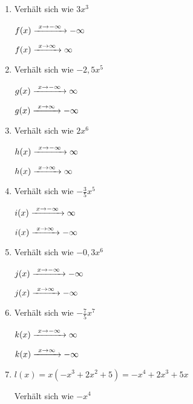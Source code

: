 \begin{Answer}[ref=ganzVerA1]

	\begin{minipage}{\textwidth}
		\begin{minipage}[t]{0.5\textwidth}
			\begin{enumerate}[label=\alph*)]
				\item Verhält sich wie \(3x^3\)

				\(f(x)\xrightarrow{\hphantom{\ }x\to-\infty\hphantom{\ }}-\infty\)

				\(f(x)\xrightarrow{\hphantom{\ }x\to\infty\hphantom{\ }}\infty\)
				\item Verhält sich wie \(-2,5x^5\)

				\(g(x)\xrightarrow{\hphantom{\ }x\to-\infty\hphantom{\ }}\infty\)

				\(g(x)\xrightarrow{\hphantom{\ }x\to\infty\hphantom{\ }}-\infty\)
				\item Verhält sich wie \(2x^6\)

				\(h(x)\xrightarrow{\hphantom{\ }x\to-\infty\hphantom{\ }}\infty\)

				\(h(x)\xrightarrow{\hphantom{\ }x\to\infty\hphantom{\ }}\infty\)
				\item Verhält sich wie \(-\frac{3}{5}x^5\)

				\(i(x)\xrightarrow{\hphantom{\ }x\to-\infty\hphantom{\ }}\infty\)

				\(i(x)\xrightarrow{\hphantom{\ }x\to\infty\hphantom{\ }}-\infty\)
			\end{enumerate}
		\end{minipage}%
		\begin{minipage}[t]{0.5\textwidth}
			\begin{enumerate}[label=\alph*)]
				\setcounter{enumi}{4}
				\item Verhält sich wie \(-0,3x^6\)

				\(j(x)\xrightarrow{\hphantom{\ }x\to-\infty\hphantom{\ }}-\infty\)

				\(j(x)\xrightarrow{\hphantom{\ }x\to\infty\hphantom{\ }}-\infty\)
				\item Verhält sich wie \(-\frac{7}{5}x^7\)

				\(k(x)\xrightarrow{\hphantom{\ }x\to-\infty\hphantom{\ }}\infty\)

				\(k(x)\xrightarrow{\hphantom{\ }x\to\infty\hphantom{\ }}-\infty\)
				\item \(l(x)=x\left(-x^3+2x^2+5\right)=-x^4+2x^3+5x\)

				Verhält sich wie \(-x^4\)


\end{enumerate}
\end{minipage}
\end{minipage}
\end{Answer}
